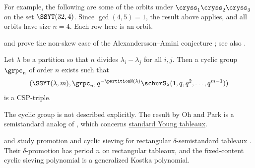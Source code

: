 \begin{example*}[Orbits for $\lambda=32$ and $n=4$]
For example, the following are some of the orbits under $\cryss_{1}\cryss_{2}\cryss_{3}$ on the set $\SSYT(32,4)$.
Since $\gcd(4,5)=1$, the result above applies, and all orbits have size $n=4$.
Each row here is an orbit.
\begin{figure}
\end{figure}
\begin{figure}
\end{figure}
\begin{figure}
\end{figure}
\begin{figure}
\end{figure}
\begin{figure}
\end{figure}
\begin{figure}
\end{figure}
\end{example*}


 and  prove the non-skew
case of the Alexandersson--Amini conjecture
\cite[Cor.~3.4]{OhPark2021}; see also \cite{AlexanderssonAmini2018}.
\begin{theorem}[Oh--Park 2020]
Let $\lambda$ be a partition so that $n$ divides $\lambda_i - \lambda_j$ for all $i,j$.
Then a cyclic group $\grpc_n$ of order $n$ exists such that
\[
(\SSYT(\lambda,m),\grpc_n,q^{-\partitionN(\lambda)}\schurS_{\lambda}(1,q,q^2,\dotsc,q^{m-1}))
\]
is a CSP-triple.
\end{theorem}
The cyclic group is not described explicitly.
The result by Oh and Park is a semistandard analog of
\cite[Thm.~46]{AlexanderssonPfannererRubeyUhlin2020x},
which concerns \hyperref[standardYoungTableau]{standard Young tableaux}.

 and  study promotion and cyclic
sieving for rectangular $\delta$-semistandard tableaux
\cite{AkhmejanovElek2020x}.  Their $\delta$-promotion has period $n$ on
rectangular tableaux, and the fixed-content cyclic sieving polynomial is a
generalized Kostka polynomial.


